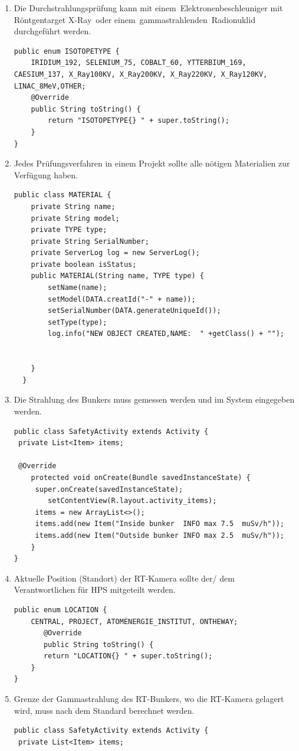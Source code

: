 \begin{enumerate}
\item Die Durchstrahlungsprüfung kann mit einem Elektronenbeschleuniger mit Röntgentarget
X-Ray oder einem gammastrahlenden Radionuklid durchgeführt werden.
\begin{lstlisting}[frame=single]
public enum ISOTOPETYPE {
    IRIDIUM_192, SELENIUM_75, COBALT_60, YTTERBIUM_169, CAESIUM_137, X_Ray100KV, X_Ray200KV, X_Ray220KV, X_Ray120KV, LINAC_8MeV,OTHER;
    @Override
    public String toString() {
        return "ISOTOPETYPE{} " + super.toString();
    }
}
\end{lstlisting}
\item Jedes Prüfungsverfahren in einem Projekt sollte alle nötigen Materialien zur Verfügung
haben.\\
\begin{lstlisting}[frame=single]
public class MATERIAL {
    private String name;
    private String model;
    private TYPE type;
    private String SerialNumber;
    private ServerLog log = new ServerLog();
    private boolean isStatus;
    public MATERIAL(String name, TYPE type) {
        setName(name);
        setModel(DATA.creatId("-" + name));
        setSerialNumber(DATA.generateUniqueId());
        setType(type);
        log.info("NEW OBJECT CREATED,NAME:  " +getClass() + "");


    }
  }
\end{lstlisting}
\item Die Strahlung des Bunkers muss gemessen werden und im System eingegeben werden.\\
\begin{lstlisting}[frame=single]
public class SafetyActivity extends Activity {
 private List<Item> items;
 
 @Override
    protected void onCreate(Bundle savedInstanceState) {
     super.onCreate(savedInstanceState);
        setContentView(R.layout.activity_items);
     items = new ArrayList<>();
     items.add(new Item("Inside bunker  INFO max 7.5  muSv/h"));
     items.add(new Item("Outside bunker INFO max 2.5  muSv/h"));
    }
}
\end{lstlisting}
\item Aktuelle Position (Standort) der RT-Kamera sollte der/ dem Verantwortlichen für HPS
mitgeteilt werden.\\
\begin{lstlisting}[frame=single]
public enum LOCATION {
    CENTRAL, PROJECT, ATOMENERGIE_INSTITUT, ONTHEWAY;
       @Override
       public String toString() {
       return "LOCATION{} " + super.toString();
    }
}
\end{lstlisting}
\item Grenze der Gammastrahlung des RT-Bunkers, wo die RT-Kamera gelagert wird, muss nach
dem Standard berechnet werden.\\
\begin{lstlisting}[frame=single]
public class SafetyActivity extends Activity {
 private List<Item> items;
 

\end{lstlisting}
\end{enumerate}
